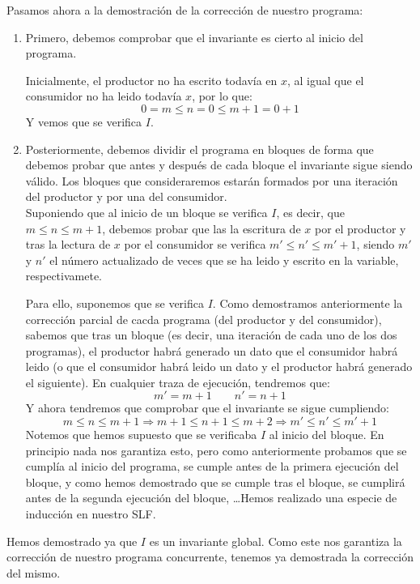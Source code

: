 \begin{ejemplo}
Pasamos ahora a la demostración de la corrección de nuestro programa:
\begin{enumerate}
    \item Primero, debemos comprobar que el invariante es cierto al inicio del programa.
    
        Inicialmente, el productor no ha escrito todavía en $x$, al igual que el consumidor no ha leido todavía $x$, por lo que:
        \begin{equation*}
            0 = m \leq n = 0 \leq m+1 = 0+1
        \end{equation*}
        Y vemos que se verifica $I$.
    \item Posteriormente, debemos dividir el programa en bloques de forma que debemos probar que antes y después de cada bloque el invariante sigue siendo válido. Los bloques que consideraremos estarán formados por una iteración del productor y por una del consumidor.\\

        Suponiendo que al inicio de un bloque se verifica $I$, es decir, que $m\leq n\leq m+1$, debemos probar que las la escritura de $x$ por el productor y tras la lectura de $x$ por el consumidor se verifica $m'\leq n' \leq m'+1$, siendo $m'$ y $n'$ el número actualizado de veces que se ha leido y escrito en la variable, respectivamete.

        Para ello, suponemos que se verifica $I$. Como demostramos anteriormente la corrección parcial de cacda programa (del productor y del consumidor), sabemos que tras un bloque (es decir, una iteración de cada uno de los dos programas), el productor habrá generado un dato que el consumidor habrá leido (o que el consumidor habrá leido un dato y el productor habrá generado el siguiente). En cualquier traza de ejecución, tendremos que:
        \begin{equation*}
            m' = m+1 \qquad n' = n+1
        \end{equation*}
        Y ahora tendremos que comprobar que el invariante se sigue cumpliendo:
        \begin{equation*}
            m\leq n\leq m+1 \Longrightarrow m+1\leq n+1\leq m+2 \Longrightarrow m' \leq n' \leq m'+1
        \end{equation*}
        Notemos que hemos supuesto que se verificaba $I$ al inicio del bloque. En principio nada nos garantiza esto, pero como anteriormente probamos que se cumplía al inicio del programa, se cumple antes de la primera ejecución del bloque, y como hemos demostrado que se cumple tras el bloque, se cumplirá antes de la segunda ejecución del bloque, \ldots Hemos realizado una especie de inducción en nuestro SLF.
\end{enumerate}
Hemos demostrado ya que $I$ es un invariante global. Como este nos garantiza la corrección de nuestro programa concurrente, tenemos ya demostrada la corrección del mismo.
\end{ejemplo}

